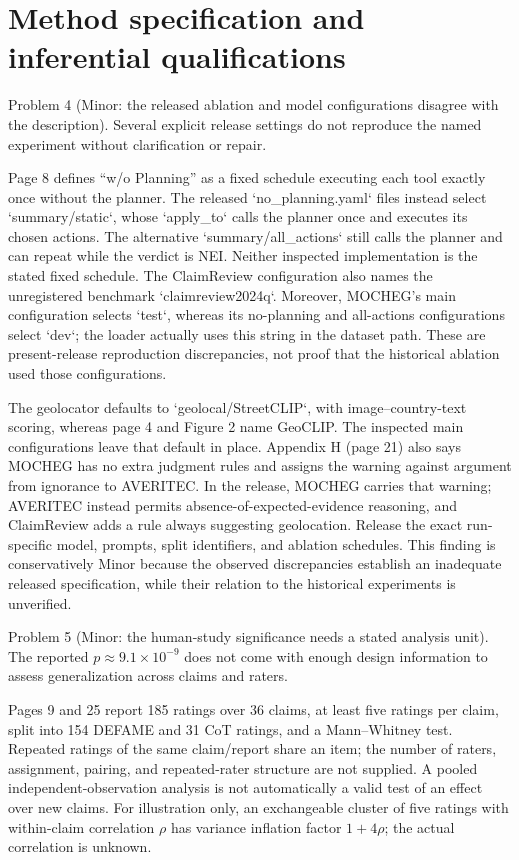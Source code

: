 \documentclass[10pt]{article}
\begin{document}
\section*{Method specification and inferential qualifications}
Problem 4 (Minor: the released ablation and model configurations disagree with the description).  Several explicit release settings do not reproduce the named experiment without clarification or repair.\par
Page 8 defines “w/o Planning” as a fixed schedule executing each tool exactly once without the planner. The released `no\_planning.yaml` files instead select `summary/static`, whose `apply\_to` calls the planner once and executes its chosen actions. The alternative `summary/all\_actions` still calls the planner and can repeat while the verdict is NEI. Neither inspected implementation is the stated fixed schedule. The ClaimReview configuration also names the unregistered benchmark `claimreview2024q`. Moreover, MOCHEG’s main configuration selects `test`, whereas its no-planning and all-actions configurations select `dev`; the loader actually uses this string in the dataset path. These are present-release reproduction discrepancies, not proof that the historical ablation used those configurations.\par
The geolocator defaults to `geolocal/StreetCLIP`, with image–country-text scoring, whereas page 4 and Figure 2 name GeoCLIP. The inspected main configurations leave that default in place. Appendix H (page 21) also says MOCHEG has no extra judgment rules and assigns the warning against argument from ignorance to AVERITEC. In the release, MOCHEG carries that warning; AVERITEC instead permits absence-of-expected-evidence reasoning, and ClaimReview adds a rule always suggesting geolocation. Release the exact run-specific model, prompts, split identifiers, and ablation schedules. This finding is conservatively Minor because the observed discrepancies establish an inadequate released specification, while their relation to the historical experiments is unverified.\par
Problem 5 (Minor: the human-study significance needs a stated analysis unit).  The reported \(p\approx9.1\times10^{-9}\) does not come with enough design information to assess generalization across claims and raters.\par
Pages 9 and 25 report 185 ratings over 36 claims, at least five ratings per claim, split into 154 DEFAME and 31 CoT ratings, and a Mann–Whitney test. Repeated ratings of the same claim/report share an item; the number of raters, assignment, pairing, and repeated-rater structure are not supplied. A pooled independent-observation analysis is not automatically a valid test of an effect over new claims. For illustration only, an exchangeable cluster of five ratings with within-claim correlation \(\rho\) has variance inflation factor \(1+4\rho\); the actual correlation is unknown.\par
\end{document}
